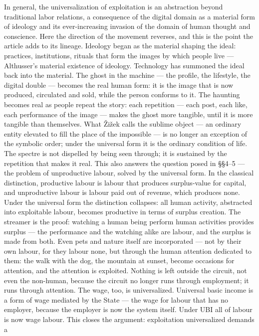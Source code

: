 \documentclass[11pt]{article}
\begin{document}
In general, the
universalization of exploitation is an abstraction beyond traditional
labor relations, a consequence of the digital domain as a material form
of ideology and its ever-increasing invasion of the domain of human
thought and conscience. Here the direction of the movement reverses, and
this is the point the article adds to its lineage. Ideology began as the
material shaping the ideal: practices, institutions, rituals that form
the images by which people live --- Althusser's material existence of
ideology. Technology has summoned the ideal back into the material. The
ghost in the machine --- the profile, the lifestyle, the digital double
--- becomes the real human form: it is the image that is now produced,
circulated and sold, while the person conforms to it. The haunting
becomes real as people repeat the story: each repetition --- each post,
each like, each performance of the image --- makes the ghost more
tangible, until it is more tangible than themselves. What
\v{Z}i\v{z}ek calls the sublime object --- an ordinary entity elevated
to fill the place of the impossible --- is no longer an exception of the
symbolic order; under the universal form it is the ordinary condition of
life. The spectre is not dispelled by being seen through; it is
sustained by the repetition that makes it real. This also
answers the question posed in §§4--5 --- the problem of unproductive
labour, solved by the universal form. In the classical distinction,
productive labour is labour that produces surplus-value for capital, and
unproductive labour is labour paid out of revenue, which produces none.
Under the universal form the distinction collapses: all human activity,
abstracted into exploitable labour, becomes productive in terms of
surplus creation. The streamer is the proof: watching a human being
perform human activities provides surplus --- the performance and the
watching alike are labour, and the surplus is made from both. Even pets
and nature itself are incorporated --- not by their own labour, for they
labour none, but through the human attention dedicated to them: the walk
with the dog, the mountain at sunset, become occasions for attention,
and the attention is exploited. Nothing is left outside the circuit, not
even the non-human, because the circuit no longer runs through
employment; it runs through attention. The wage, too,
is universalized. Universal basic income is a form of wage mediated by
the State --- the wage for labour that has no employer, because the
employer is now the system itself. Under UBI all of labour is now wage
labour. This closes the argument: exploitation universalized demands a
\end{document}

